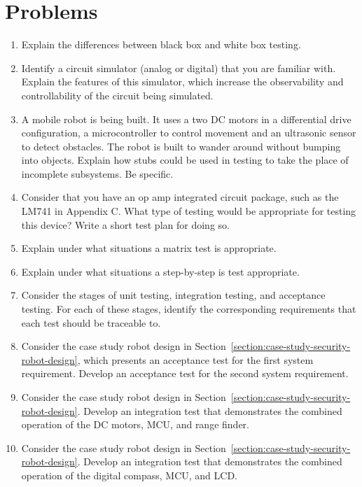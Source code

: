 \section{Problems}
\label{section:testingProblems}

\begin{enumerate}
\def\labelenumi{\arabic{enumi}.}
\item
  Explain the differences between black box and white box testing.
\item
  Identify a circuit simulator (analog or digital) that you are familiar
  with. Explain the features of this simulator, which increase the
  observability and controllability of the circuit being simulated.
\item
  A mobile robot is being built. It uses a two DC motors in a
  differential drive configuration, a microcontroller to control
  movement and an ultrasonic sensor to detect obstacles. The robot is
  built to wander around without bumping into objects. Explain how stubs
  could be used in testing to take the place of incomplete subsystems.
  Be specific.
\item
  Consider that you have an op amp integrated circuit package, such as
  the LM741 in Appendix C. What type of testing would be appropriate for
  testing this device? Write a short test plan for doing so.
\item
  Explain under what situations a matrix test is appropriate.
\item
  Explain under what situations a step-by-step is test appropriate.
\item
  Consider the stages of unit testing, integration testing, and
  acceptance testing. For each of these stages, identify the
  corresponding requirements that each test should be traceable to.
\item
  Consider the case study robot design in Section~\ref{section:case-study-security-robot-design}, 
  which presents an
  acceptance test for the first system requirement. Develop an
  acceptance test for the second system requirement.
\item
  Consider the case study robot design in Section~\ref{section:case-study-security-robot-design}. 
  Develop an
  integration test that demonstrates the combined operation of the DC
  motors, MCU, and range finder.
\item
  Consider the case study robot design in Section~\ref{section:case-study-security-robot-design}. 
  Develop an
  integration test that demonstrates the combined operation of the
  digital compass, MCU, and LCD.

\end{enumerate}

